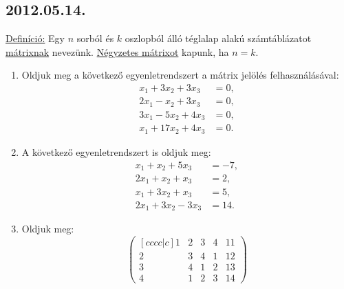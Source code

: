 \subsection*{2012.05.14.}
\underline{Definíció:} Egy $n$ sorból és $k$ oszlopból álló téglalap alakú számtáblázatot \underline{mátrixnak} nevezünk. \underline{Négyzetes mátrixot} kapunk, ha $n=k$.
\begin{enumerate}
\item Oldjuk meg a következő egyenletrendszert a mátrix jelölés felhasználásával:
\begin{align*}
x_1+3x_2+3x_3&=0,\\
2x_1-x_2+3x_3&=0,\\
3x_1-5x_2+4x_3&=0,\\
x_1+17x_2+4x_3&=0.
\end{align*}
\item A következő egyenletrendszert is oldjuk meg:
\begin{align*}
x_1+x_2+5x_3&=-7,\\
2x_1+x_2+x_3&=2,\\
x_1+3x_2+x_3&=5,\\
2x_1+3x_2-3x_3&=14.
\end{align*}

\item Oldjuk meg:
 $$\begin{pmatrix}[cccc|c]
 1&2&3&4&11\\
 2&3&4&1&12\\
 3&4&1&2&13\\
 4&1&2&3&14
 \end{pmatrix}$$
\end{enumerate}


